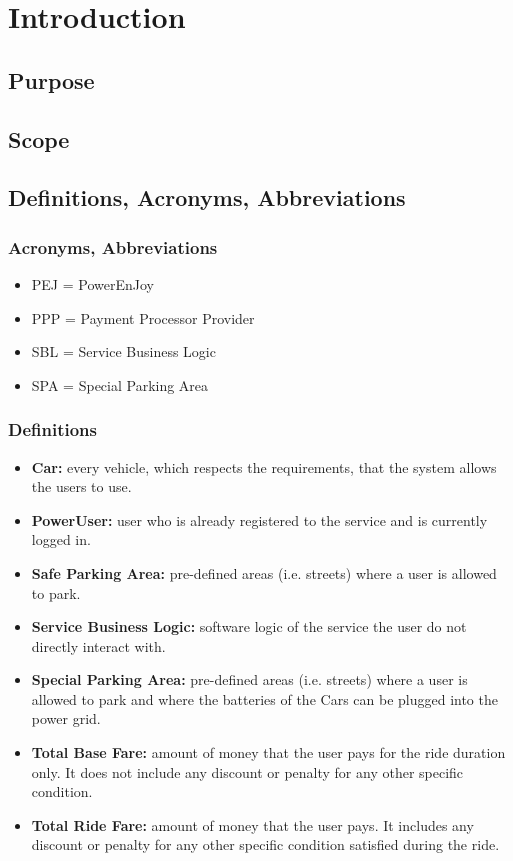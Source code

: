 \section{Introduction}

\subsection{Purpose}


\subsection{Scope}


\subsection{Definitions, Acronyms, Abbreviations}
\subsubsection{Acronyms, Abbreviations}
\begin{itemize}
    \item PEJ = PowerEnJoy
    \item PPP = Payment Processor Provider
    \item SBL = Service Business Logic
    \item SPA = Special Parking Area
\end{itemize}
\subsubsection{Definitions}
\begin{itemize}
    \item \textbf{Car:} every vehicle, which respects the requirements, that the system allows the users to use.
    \item\textbf{PowerUser:} user who is already registered to the service and is currently logged in.
    \item \textbf{Safe Parking Area:} pre-defined areas (i.e. streets) where a user is allowed to park.
    \item \textbf{Service Business Logic:} software logic of the service the user do not directly interact with.
    \item \textbf{Special Parking Area:} pre-defined areas (i.e. streets) where a user is allowed to park and where the batteries of the Cars can be plugged into the power grid.
    \item \textbf{Total Base Fare:} amount of money that the user pays for the ride duration only. It does not include any discount or penalty for any other specific condition.
    \item \textbf{Total Ride Fare:} amount of money that the user pays. It includes any discount or penalty for any other specific condition satisfied during the ride.
\end{itemize}

